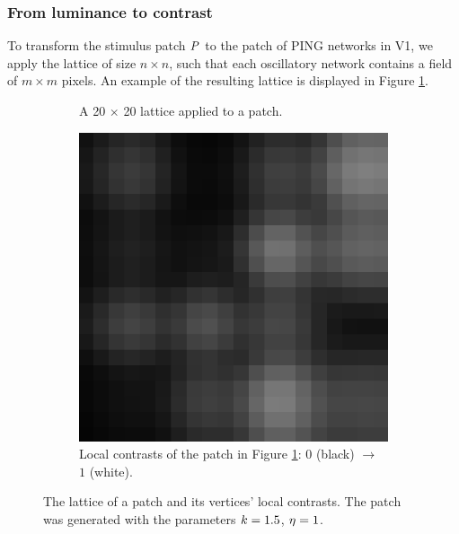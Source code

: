 \subsubsection{From luminance to contrast}

To transform the stimulus patch $P$ to the patch of PING networks in V1, we apply the lattice of size $n \times n$, such that each oscillatory network contains a field of $m \times m$ pixels. An example of the resulting lattice is displayed in Figure \ref{fig:llc-lattice-example}.


\begin{figure}[!htp]
    \centering
    \begin{subfigure}[t]{0.4\textwidth}
        \centering
        
        \caption{A 20 $\times$ 20 lattice applied to a patch.}
        \label{fig:llc-lattice-example}
    \end{subfigure}
    \hspace{0.06\textwidth}
    \begin{subfigure}[t]{0.4\textwidth}
        \centering
        \includegraphics[width=\textwidth]{src/assets/images/local-contrast.png}
        \caption{Local contrasts of the patch in Figure \ref{fig:llc-lattice-example}: $0$ (black) $\to$ $1$ (white).}
        \label{fig:llc-local-contrast-example}
    \end{subfigure}
    \caption[Patch lattice and local contrast]{The lattice of a patch and its vertices' local contrasts. 
    The patch was generated with the parameters $k = 1.5$, $\eta = 1$.}
    \label{fig:lattice-local-contrast-example}
\end{figure}


